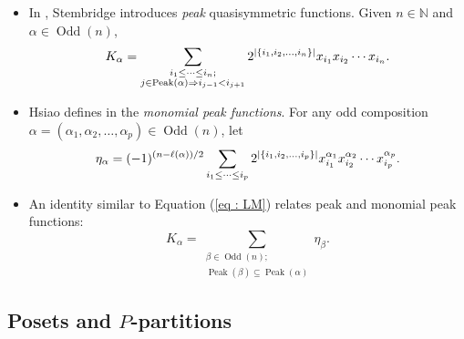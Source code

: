 \documentclass[numbers=enddot,12pt,final,onecolumn,notitlepage]{scrartcl}%
\newcommand{\al}{\alpha}
\newcommand{\NN}{\mathbb{N}} %
\newcommand{\Odd}{\operatorname{Odd}}
\newcommand{\Peak}{\operatorname{Peak}}
\newcommand{\defn}[1]{{\color{darkred}\emph{#1}}}
\newcommand{\0}{\phantom{c}}
\let\sumnonlimits\sum
\renewcommand{\sum}{\sumnonlimits\limits}
\begin{document}
\begin{itemize}
\item In \cite{Ste97}, Stembridge introduces \defn{peak} quasisymmetric functions. Given $n \in \NN$ and $\al \in \Odd(n)$,
\begin{equation*}
\label{eq : K}
K_{\al} = \sum\limits_{\substack{i_1 \leq \dots \leq i_n;\\j\in \Peak(\al) \Rightarrow  i_{j-1}<i_{j+1}}}2^{|\{i_1,i_2,\dots,i_n\}|} x_{i_1}x_{i_2} \cdots x_{i_n}.
\end{equation*}
\item  Hsiao defines in \cite{Hsi07} the \defn{monomial peak functions}. For any odd composition $\al =(\al_1,\al_2,\dots,\al_p)\in \Odd(n)$, let
\begin{equation}
\label{eq : monpeak}
\eta_{\al} = (-1)^{(n-\ell(\al))/2}\sum\limits_{\substack{i_1 \leq \dots \leq i_p}}2^{|\{i_1,i_2,\dots,i_p\}|} x_{i_1}^{\al_1}x_{i_2}^{\al_2} \cdots x_{i_p}^{\al_p}.
\end{equation}
\item An identity similar to Equation (\ref{eq : LM}) relates peak and monomial peak functions:
\begin{equation}
\label{eq : KE} K_{\al} = \sum_{{\substack{\beta \in \Odd(n);\\ \Peak(\beta) \subseteq \Peak(\al)}}} \eta_{\beta}.
\end{equation}
\end{itemize}

\subsection{Posets and $P$-partitions}
\label{sec : poset}
\end{document}
